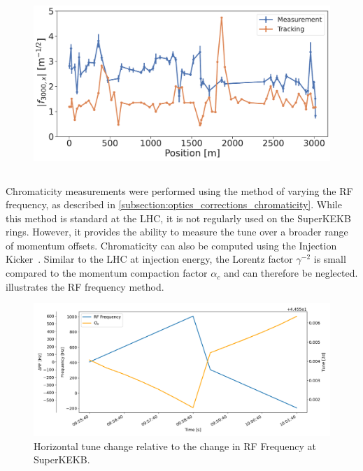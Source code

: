 \begin{figure}[!htb]
    \centering
    \includegraphics[width=0.8\linewidth]{images/kek/f3000x_LER.pdf}
    \caption{}
    \label{fig:kek:rdt_f3000x_LER}
\end{figure}



\FloatBarrier
\subsection{}

Chromaticity measurements were performed using the method of varying the RF frequency, as described
in \cref{subsection:optics_corrections_chromaticity}. While this method is standard at the LHC, it
is not regularly used on the SuperKEKB rings. However, it provides the ability to measure the tune
over a broader range of momentum offsets. Chromaticity can also be computed using the Injection
Kicker~\cite{keintzel_jacqueline_beam_2022}. Similar to the LHC at injection energy, the Lorentz
factor $\gamma^{-2}$ is small compared to the momentum compaction factor $\alpha_c$ and can
therefore be neglected.
 illustrates the RF frequency method.

\begin{figure}[!htb]
    \centering
    \includegraphics[width=\linewidth]{images/kek/rf_qx.png}
    \caption{Horizontal tune change relative to the change in RF Frequency at SuperKEKB.}
    \label{fig:kek:chroma_procedure}
\end{figure}

